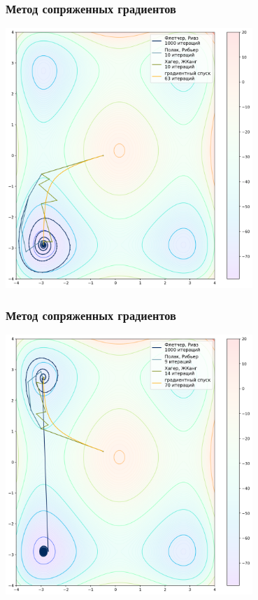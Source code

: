 \documentclass[9pt]{beamer}
\begin{document}
\begin{frame}
    \frametitle{Метод сопряженных градиентов}
    \begin{center}
        \includegraphics[width=0.7\textwidth]{grad_1.png}    
    \end{center}
\end{frame}


\begin{frame}
    \frametitle{Метод сопряженных градиентов}
    \begin{center}
        \includegraphics[width=0.7\textwidth]{grad_2.png}    
    \end{center}
\end{frame}
\end{document}
